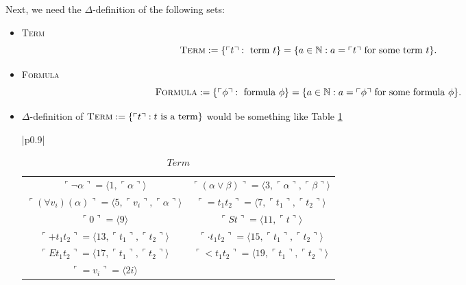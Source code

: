 \documentclass[11pt,letterpaper]{book}
\theoremstyle{definition}
\begin{document}
Next, we need the $\Delta$-definition of the following sets:
\begin{itemize}
\item{\textsc{Term}
$$ \text{\textsc{Term}} : = \{ \ulcorner t \urcorner : \text{ term } t \} = \{ a \in \mathbb{N} : a = \ulcorner t \urcorner \text{ for some term } t \} . $$
}
\item{\textsc{Formula}
$$\text{\textsc{Formula}} : = \{\ulcorner \phi \urcorner : \text{ formula } \phi  \} = \{ a \in \mathbb{N} : a = \ulcorner \phi \urcorner   \text{ for some formula } \phi \} .$$
}
\item{$\Delta$-definition of $\text{\textsc{Term}} : = \{ \ulcorner t \urcorner : t \text{ is a term} \}$ would be something like Table \ref{box:terms_trail}

\begin{table}[h]
\caption{$Term$}
\label{box:terms_trail}
\begin{tabular}{|p{0.9\linewidth}|}
\hline
\rule{0pt}{3ex}
\begin{center}
\begin{tabular}{cc}
$\ulcorner \lnot \alpha \urcorner = \langle 1, \ulcorner \alpha \urcorner \rangle $ & $\ulcorner (\alpha \lor \beta) \urcorner = \langle 3, \ulcorner \alpha \urcorner, \ulcorner \beta \urcorner \rangle$ \\
$\ulcorner (\forall v_i) (\alpha)  \urcorner = \langle 5, \ulcorner v_i \urcorner, \ulcorner \alpha \urcorner \rangle$  & $\ulcorner = t_1 t_2 \urcorner = \langle 7, \ulcorner t_1 \urcorner, \ulcorner t_2 \urcorner \rangle$ \\
$\ulcorner 0 \urcorner = \langle 9 \rangle$ & $\ulcorner S t \urcorner = \langle 11, \ulcorner t \urcorner \rangle$ \\
$\ulcorner + t_1 t_2 \urcorner = \langle 13, \ulcorner t_1 \urcorner, \ulcorner t_2 \urcorner \rangle$ & $\ulcorner \cdot t_1 t_2 \urcorner = \langle 15, \ulcorner t_1 \urcorner, \ulcorner t_2 \urcorner \rangle$ \\
$\ulcorner E t_1 t_2 \urcorner = \langle 17, \ulcorner t_1 \urcorner, \ulcorner t_2 \urcorner \rangle$ & $\ulcorner < t_1 t_2 \urcorner = \langle 19, \ulcorner t_1 \urcorner, \ulcorner t_2 \urcorner \rangle$ \\
$\ulcorner = v_i \urcorner = \langle 2 i \rangle$  & 
\end{tabular}
\end{center} \\
\hline
\end{tabular}


\end{table}}
\end{itemize}
\end{document}
